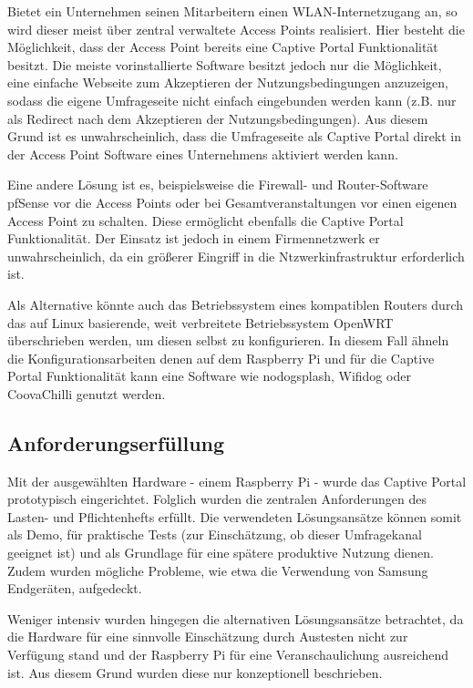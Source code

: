 Bietet ein Unternehmen seinen Mitarbeitern einen WLAN-Internetzugang an, so wird dieser meist über zentral verwaltete Access Points realisiert. Hier besteht die Möglichkeit, dass der Access Point bereits eine Captive Portal Funktionalität besitzt. Die meiste vorinstallierte Software besitzt jedoch nur die Möglichkeit, eine einfache Webseite zum Akzeptieren der Nutzungsbedingungen anzuzeigen, sodass die eigene Umfrageseite nicht einfach eingebunden werden kann (z.B. nur als Redirect nach dem Akzeptieren der Nutzungsbedingungen). Aus diesem Grund ist es unwahrscheinlich, dass die Umfrageseite als Captive Portal direkt in der Access Point Software eines Unternehmens aktiviert werden kann.

Eine andere Lösung ist es, beispielsweise die Firewall- und Router-Software pfSense vor die Access Points oder bei Gesamtveranstaltungen vor einen eigenen Access Point zu schalten. Diese ermöglicht ebenfalls die Captive Portal Funktionalität. Der Einsatz ist jedoch in einem Firmennetzwerk er unwahrscheinlich, da ein größerer Eingriff in die Ntzwerkinfrastruktur erforderlich ist.

Als Alternative könnte auch das Betriebssystem eines kompatiblen Routers durch das auf Linux basierende, weit verbreitete Betriebssystem OpenWRT überschrieben werden, um diesen selbst zu konfigurieren. In diesem Fall ähneln die Konfigurationsarbeiten denen auf dem Raspberry Pi und für die Captive Portal Funktionalität kann eine Software wie nodogsplash, Wifidog oder CoovaChilli genutzt werden.


\subsection{Anforderungserfüllung}
Mit der ausgewählten Hardware - einem Raspberry Pi - wurde das Captive Portal prototypisch eingerichtet. Folglich wurden die zentralen Anforderungen des Lasten- und Pflichtenhefts erfüllt. Die verwendeten Lösungsansätze können somit als Demo, für praktische Tests (zur Einschätzung, ob dieser Umfragekanal geeignet ist) und als Grundlage für eine spätere produktive Nutzung dienen. Zudem wurden mögliche Probleme, wie etwa die Verwendung von Samsung Endgeräten, aufgedeckt.

Weniger intensiv wurden hingegen die alternativen Lösungsansätze betrachtet, da die Hardware für eine sinnvolle Einschätzung durch Austesten nicht zur Verfügung stand und der Raspberry Pi für eine Veranschaulichung ausreichend ist. Aus diesem Grund wurden diese nur konzeptionell beschrieben.

